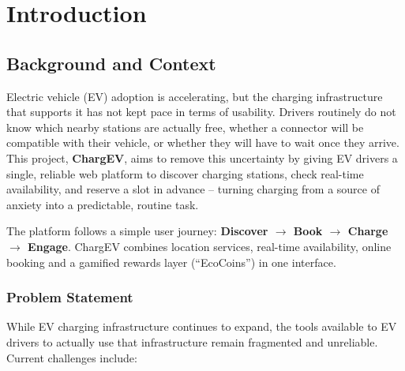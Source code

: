 \documentclass{tietreport}
\author{%
  \texttt{1024170103} Pehal \\
  \texttt{1024170431} Briti Arora%
}
\begin{document}
\maketitle

\tableofcontents


\chapter{Introduction}

\section{Background and Context}

Electric vehicle (EV) adoption is accelerating, but the
charging infrastructure that supports it has not kept
pace in terms of usability. Drivers routinely do not
know which nearby stations are actually free, whether a
connector will be compatible with their vehicle, or
whether they will have to wait once they arrive. This
project, \textbf{ChargEV}, aims to remove this
uncertainty by giving EV drivers a single, reliable web
platform to discover charging stations, check real-time
availability, and reserve a slot in advance -- turning
charging from a source of anxiety into a predictable,
routine task.

The platform follows a simple user journey:
\textbf{Discover $\rightarrow$ Book $\rightarrow$ Charge
$\rightarrow$ Engage}. ChargEV combines location
services, real-time availability, online booking and a
gamified rewards layer (``EcoCoins'') in one interface.

\subsection{Problem Statement}

While EV charging infrastructure continues to expand,
the tools available to EV drivers to actually use that
infrastructure remain fragmented and unreliable. Current
challenges include:
\end{document}
